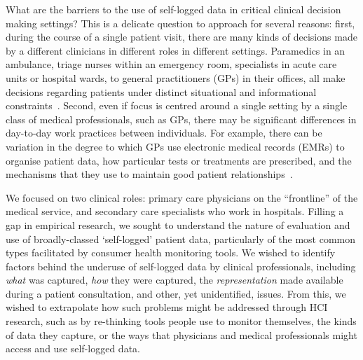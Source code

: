 \documentclass{sigchi}
\begin{document}

What are the barriers to the use of self-logged data in critical clinical decision making settings?  This is a delicate question to approach for several reasons: first, during the course of a single patient visit, there are many kinds of decisions made by a different clinicians in different roles in different settings.   Paramedics in an ambulance, triage nurses within an emergency room, specialists in acute care units or hospital wards, to general practitioners (GPs) in their offices, all make decisions regarding patients under distinct situational and informational constraints~\cite{Croskerry2013}. Second, even if focus is centred around a single setting by a single class of medical professionals, such as GPs, there may be significant differences in day-to-day work practices between individuals. For example, there can be variation in the degree to which GPs use electronic medical records (EMRs) to organise patient data, how particular tests or treatments are prescribed, and the mechanisms that they use to maintain good patient relationships~\cite{smellie_is_2002}. 

We focused on two clinical roles: primary care physicians on the ``frontline'' of the medical service, and secondary care specialists who work in hospitals.  Filling a gap in empirical research, we sought to understand the nature of evaluation and use of broadly-classed `self-logged' patient data, particularly of the most common types facilitated by consumer health monitoring tools.  We wished to identify factors behind the underuse of self-logged data by clinical professionals, including \emph{what} was captured, \emph{how} they were  captured,  the \emph{representation} made available during a patient consultation, and other, yet unidentified, issues.  From this, we wished to extrapolate how such problems might be addressed through HCI research, such as by re-thinking tools people use to monitor themselves, the kinds of data they capture, or the ways that physicians and medical professionals might access and use self-logged data.

\end{document}
